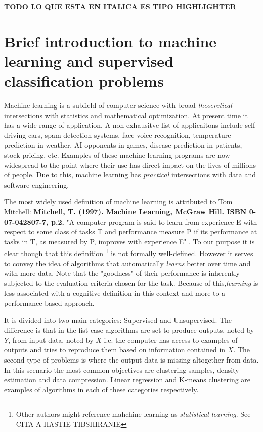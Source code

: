 
\textbf{TODO LO QUE ESTA EN ITALICA ES TIPO HIGHLIGHTER}

\section{ Brief introduction to machine learning and supervised classification problems}

Machine learning is a subfield of computer science with broad \textit{theoeretical} intersections with statistics and mathematical optimization. At present time it has a wide range of application. A non-exhausitve list of applicaitons include self-driving cars, spam detection systems, face-voice recognition, temperature prediction in weather, AI opponents in games, disease prediction in patients, stock pricing, etc. Examples of these machine learning programs are now widespread to the point where their use has direct impact on the lives of millions of people. Due to this, machine learning has \textit{practical} intersections with data and software engineering.

The most widely used definition of machine learning is attributed to Tom Mitchell: 	\textbf{Mitchell, T. (1997). Machine Learning, McGraw Hill. ISBN 0-07-042807-7, p.2.} 
"A computer program is said to learn from experience E with respect to some class of tasks T and performance measure P if its performance at tasks in T, as measured by P, improves with experience E" . To our purpose it is clear though that this definition \footnote{Other authors might reference mahchine learning as \textit{statistical learning}. See CITA A HASTIE TIBSHIRANIE} is not formally well-defined. However it serves to convey the idea of algorithms that automatically \textit{learns} better over time and with more data. Note that the "goodness" of their performance is inherently subjected to the evaluation criteria chosen for the task. Because of this,\textit{learning} is less associated with a cognitive definition in this context and more to a performance based approach.


It is divided into two main categories: Supervised and Unsupervised. The difference is that in the fist case algorithms are set to produce outputs, noted by $Y$, from input data, noted by $X$ i.e. the computer has access to examples of outputs and tries to reproduce them based on information contained in $X$. The second type of problems is where the output data is missing altogether from data. In this scenario the most common objectives are clustering samples, density estimation and data compression. Linear regression and K-means clustering are examples of algorithms in each of these categories respectively.


